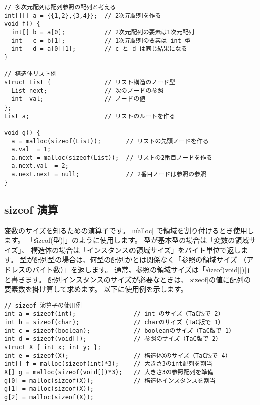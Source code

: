 \begin{mylist}
\begin{verbatim}
// 多次元配列は配列参照の配列と考える
int[][] a = {{1,2},{3,4}};  // 2次元配列を作る
void f() {
  int[] b = a[0];           // 2次元配列の要素は1次元配列
  int   c = b[1];           // 1次元配列の要素は int 型
  int   d = a[0][1];        // c と d は同じ結果になる
}

// 構造体リスト例
struct List {               // リスト構造のノード型
  List next;                // 次のノードの参照
  int  val;                 // ノードの値
};
List a;                     // リストのルートを作る

void g() {
  a = malloc(sizeof(List));       // リストの先頭ノードを作る
  a.val  = 1;
  a.next = malloc(sizeof(List));  // リストの2番目ノードを作る
  a.next.val  = 2;
  a.next.next = null;             // 2番目ノードは参照の参照
}
\end{verbatim}
\end{mylist}

\subsection{sizeof 演算}

変数のサイズを知るための演算子です。
\|malloc| で領域を割り付けるとき使用します。
「\|sizeof(型)|」のように使用します。
型が基本型の場合は「変数の領域サイズ」、
構造体の場合は「インスタンスの領域サイズ」をバイト単位で返します。
型が配列型の場合は、何型の配列かとは関係なく「参照の領域サイズ
（アドレスのバイト数）」を返します。
通常、参照の領域サイズは「\|sizeof(void[])|」と書きます。
配列インスタンスのサイズが必要なときは、
\|sizeof|の値に配列の要素数を掛け算して求めます。
以下に使用例を示します。

\begin{mylist}
\begin{verbatim}
// sizeof 演算子の使用例
int a = sizeof(int);                // int のサイズ（TaC版で 2）
int b = sizeof(char);               // charのサイズ（TaC版で 1）
int c = sizeof(boolean);            // booleanのサイズ（TaC版で 1）
int d = sizeof(void[]);             // 参照のサイズ（TaC版で 2）
struct X { int x; int y; };
int e = sizeof(X);                  // 構造体Xのサイズ（TaC版で 4）
int[] f = malloc(sizeof(int)*3);    // 大きさ3のint配列を割当
X[] g = malloc(sizeof(void[])*3);   // 大きさ3の参照配列を準備
g[0] = malloc(sizeof(X));           // 構造体インスタンスを割当
g[1] = malloc(sizeof(X));
g[2] = malloc(sizeof(X));
\end{verbatim}
\end{mylist}


